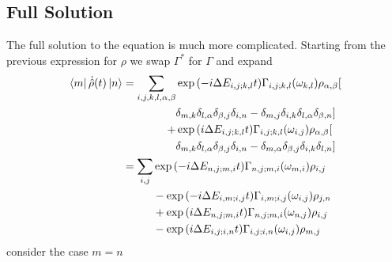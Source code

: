 \subsection{Full Solution}\label{sec:redfield equation full solution}
The full solution to the equation is
much more complicated. Starting from the
previous expression for \(\rho \) we
swap \(\Gamma^*\) for \(\Gamma \) and expand
\begin{align}
  \bra{m}\dot{\hat{\rho}}(t) \ket{n} & = \begin{aligned}[t]
    \sum_{i,j,k, l, \alpha, \beta} &
    \exp{(-i\Delta{}E_{i,j;k,l}t)}
    \Gamma_{i,j;k, l}(\omega_{k,l})
    \rho_{\alpha, \beta} [               \\ &
      \delta_{m, k}\delta_{l, \alpha}
      \delta_{\beta, j}\delta_{i, n}
      -\delta_{m, j}\delta_{i, k}
    \delta_{l, \alpha}\delta_{\beta, n}] \\
    +                              &
    \exp{(i\Delta{}E_{i,j;k,l} t)}
    \Gamma_{i,j; k, l}(\omega_{i,j})
    \rho_{\alpha, \beta} [               \\ &
      \delta_{m, k}\delta_{l, \alpha}
      \delta_{\beta, j}\delta_{i, n}
      - \delta_{m, \alpha}\delta_{\beta, j}
      \delta_{i, k}\delta_{l, n}]
  \end{aligned}                                   \\
                                     & = \begin{aligned}[t]
    \sum_{i,j} &
    \exp{(-i\Delta{}E_{n,j;m,i} t)}
    \Gamma_{n,j;m, i}(\omega_{m,i})
    \rho_{i,j}   \\
               &
    -\exp{(-i\Delta{}E_{i,m;i,j} t)}
    \Gamma_{i,m;i, j}(\omega_{i,j})
    \rho_{j, n}  \\
               &
    +\exp{(i\Delta{}E_{n,j;m,i} t)}
    \Gamma_{n,j; m, i}(\omega_{n,j})
    \rho_{i, j}  \\
               &
    -\exp{(i\Delta{}E_{i,j;i,n} t)}
    \Gamma_{i,j; i, n}(\omega_{i,j})
    \rho_{m, j}
  \end{aligned}\label{eqn:full redfield solution}
\end{align}
consider the case \(m=n\)
